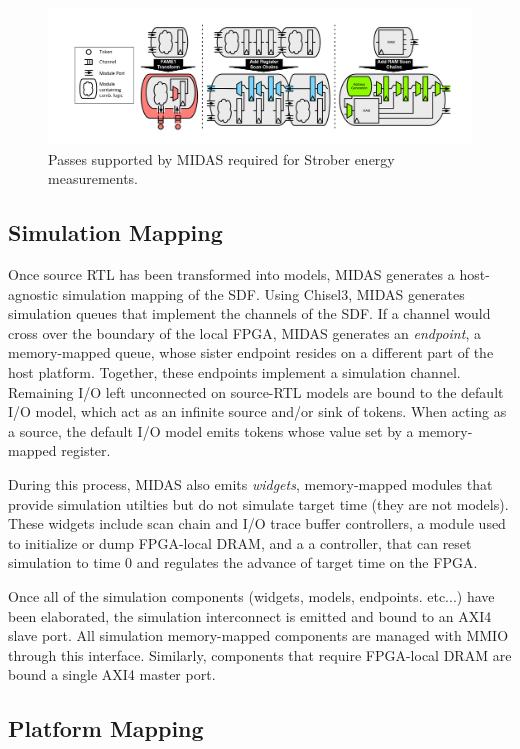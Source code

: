 \begin{figure}
	\centering
	\includegraphics[width=16cm]{figures/midas-passes.pdf}
	\caption{Passes supported by MIDAS required for Strober energy measurements.}
	\label{fig:midas-passes}
	\centering
\end{figure}

\subsection{Simulation Mapping}

Once source RTL has been transformed into models, MIDAS generates a
host-agnostic simulation mapping of the SDF. Using Chisel3, MIDAS generates
simulation queues that implement the channels of the SDF. If a channel would
cross over the boundary of the local FPGA, MIDAS generates an \emph{endpoint},
a memory-mapped queue, whose sister endpoint resides on a different part of the
host platform.  Together, these endpoints implement a simulation channel.
Remaining I/O left unconnected on source-RTL models are bound to the default
I/O model, which act as an infinite source and/or sink of tokens.  When acting
as a source, the default I/O model emits tokens whose value set by a
memory-mapped register.

During this process, MIDAS also emits \emph{widgets}, memory-mapped modules
that provide simulation utilties but do not simulate target time (they are not
models). These widgets include scan chain and I/O trace buffer controllers, a
module used to initialize or dump FPGA-local DRAM, and a a controller, that can
reset simulation to time 0 and regulates the advance of target time on the
FPGA.

Once all of the simulation components (widgets, models, endpoints. etc...) have
been elaborated, the simulation interconnect is emitted and bound to an AXI4
slave port. All simulation memory-mapped components are managed with MMIO
through this interface. Similarly, components that require FPGA-local DRAM are
bound a single AXI4 master port.

\subsection{Platform Mapping}


